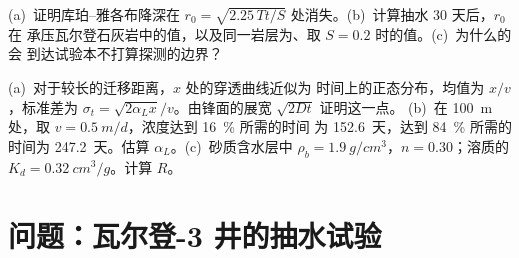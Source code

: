 \begin{exercise}[$\star\star\star$]\label{exo:b3:hydrogeology:11}
(a)~证明库珀–雅各布降深在 $r_0 =
\sqrt{2.25\,Tt/S}$ 处消失。(b)~计算抽水 30 天后，$r_0$ 在
承压瓦尔登石灰岩中的值，以及同一岩层为、取 $S =
0.2$ 时的值。(c)~为什么的会
到达试验本不打算探测的边界？
\end{exercise}

\begin{exercise}[$\star\star\star$]\label{exo:b3:hydrogeology:12}
(a)~对于较长的迁移距离，$x$ 处的穿透曲线近似为
时间上的正态分布，均值为 $x/v$，标准差为 $\sigma_t
= \sqrt{2\alpha_Lx}/v$。由锋面的展宽 $\sqrt{2Dt}$ 证明这一点。
(b)~在 \qty{100}{m} 处，取 $v = \qty{0.5}{m/d}$，浓度达到 \qty{16}{\percent} 所需的时间
为 \num{152.6}~天，达到 \qty{84}{\percent} 所需的时间为
\num{247.2}~天。估算 $\alpha_L$。(c)~砂质含水层中 $\rho_b =
\qty{1.9}{g/cm^3}$，$n = 0.30$；溶质的 $K_d =
\qty{0.32}{cm^3/g}$。计算 $R$。
\end{exercise}

\section{问题：瓦尔登-3 井的抽水试验}

